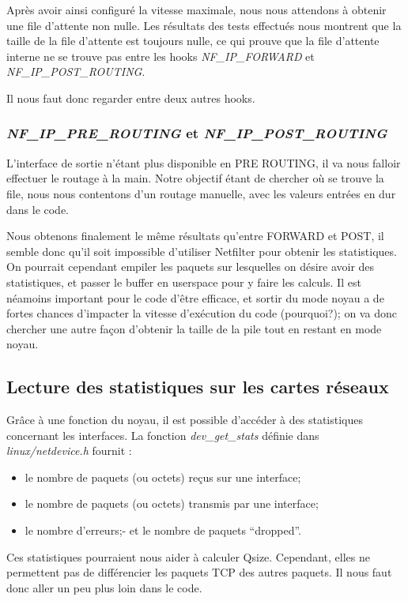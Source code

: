 \documentclass[a4paper]{article}
\begin{document}
Après avoir ainsi configuré la vitesse maximale,
nous nous attendons à obtenir une file d’attente non nulle.
Les résultats des tests effectués nous montrent que la taille
de la file d’attente est toujours nulle, ce qui prouve que la
file d’attente interne ne se trouve pas entre les hooks
\textit{NF\_IP\_FORWARD} et \textit{NF\_IP\_POST\_ROUTING}.

Il nous faut donc regarder entre deux autres hooks.

\subsubsection{\textit{NF\_IP\_PRE\_ROUTING} et \textit{NF\_IP\_POST\_ROUTING}}
L'interface de sortie n'étant plus disponible en PRE ROUTING,
il va nous falloir effectuer le routage à la main. Notre
objectif étant de chercher où se trouve la file, nous nous
contentons d'un routage manuelle, avec les valeurs entrées en
dur dans le code.

Nous obtenons finalement le même résultats qu'entre FORWARD et POST,
il semble donc qu'il soit impossible d'utiliser Netfilter pour
obtenir les statistiques. On pourrait cependant empiler les paquets
sur lesquelles on désire avoir des statistiques, et passer le
buffer en userspace pour y faire les calculs. Il est néamoins
important pour le code d'être efficace, et sortir du mode noyau
a de fortes chances d'impacter la vitesse d'exécution du code
(pourquoi?); on va donc chercher une autre façon d'obtenir
la taille de la pile tout en restant en mode noyau.

\subsection{Lecture des statistiques sur les cartes réseaux}
Grâce à une fonction du noyau, il est possible d’accéder à des
statistiques concernant les interfaces. La fonction \textit{dev\_get\_stats}
définie dans \textit{linux/netdevice.h} fournit :
\begin{itemize}
	\item le nombre de paquets (ou octets) reçus sur une interface;
	\item le nombre de paquets (ou octets) transmis par une interface;
	\item le nombre d’erreurs;- et le nombre de paquets “dropped”.
\end{itemize}

Ces statistiques pourraient nous aider à calculer Qsize. Cependant,
elles ne permettent pas de différencier les paquets TCP des autres paquets.
Il nous faut donc aller un peu plus loin dans le code.
\end{document}
